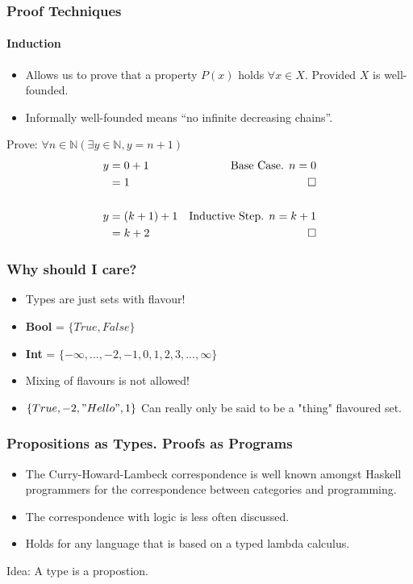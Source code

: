 \documentclass[usenames,dvipsnames]{beamer}
\begin{document}
\begin{frame}[fragile]
  \frametitle{Proof Techniques}
  \framesubtitle{Induction}
  \begin{itemize}
    \item Allows us to prove that a property $P(x)$ holds $\forall x \in X$.
          Provided $X$ is well-founded.
    \item Informally well-founded means ``no infinite decreasing chains''.
  \end{itemize}
   Prove: $\forall n \in \mathbb{N}(\exists y \in \mathbb{N}, y = n + 1)$ \\
   \begin{align*}
   y &= 0 + 1 &\text{Base Case. $n = 0$} \\
     &= 1 &\qed \\
   \\
   y &= (k + 1) + 1 &\text{Inductive Step. $n = k + 1$} \\
     &= k + 2 &\qed
   \end{align*}
\end{frame}


\begin{frame}[fragile]
  \frametitle{Why should I care?}
  \begin{itemize}
    \item Types are just sets with flavour!
    \item \textbf{Bool} = $\{True, False\}$
    \item \textbf{Int} = $\{-\infty, ..., -2, -1, 0, 1, 2, 3, ..., \infty\}$
    \item Mixing of flavours is not allowed!
    \item $\{True, -2, "Hello", 1\}$ Can really only be said to be a "thing"
          flavoured set.
  \end{itemize}
\end{frame}

\begin{frame}[fragile]
  \frametitle{Propositions as Types. Proofs as Programs}
  \begin{itemize}
    \item The Curry-Howard-Lambeck correspondence is well known amongst
          Haskell programmers for the correspondence between categories and
          programming.
    \item The correspondence with logic is less often discussed.
    \item Holds for any language that is based on a typed lambda calculus.
  \end{itemize}
  Idea: A type is a propostion.
\end{frame}
\end{document}
